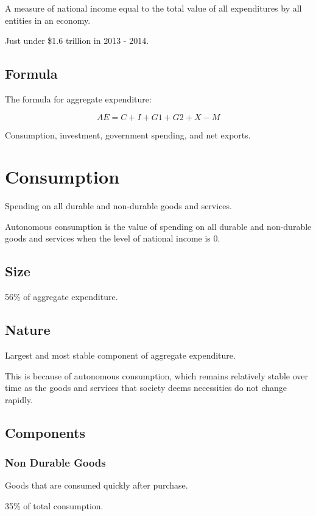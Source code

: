 \documentclass[a4paper,11pt]{report}
\begin{document}
A measure of national income equal to the total value of all expenditures
by all entities in an economy.

Just under \$1.6 trillion in 2013 - 2014.

\subsection{Formula}

The formula for aggregate expenditure:

$$
AE = C + I + G1 + G2 + X - M
$$

Consumption, investment, government spending, and net exports.


\section{Consumption}

Spending on all durable and non-durable goods and services.

Autonomous consumption is the value of spending on all durable and non-durable
goods and services when the level of national income is 0.

\subsection{Size}

56\% of aggregate expenditure.

\subsection{Nature}

Largest and most stable component of aggregate expenditure.

This is because of autonomous consumption, which remains relatively stable over
time as the goods and services that society deems necessities do not change
rapidly.

\subsection{Components}

\subsubsection{Non Durable Goods}

Goods that are consumed quickly after purchase.

35\% of total consumption.
\end{document}
